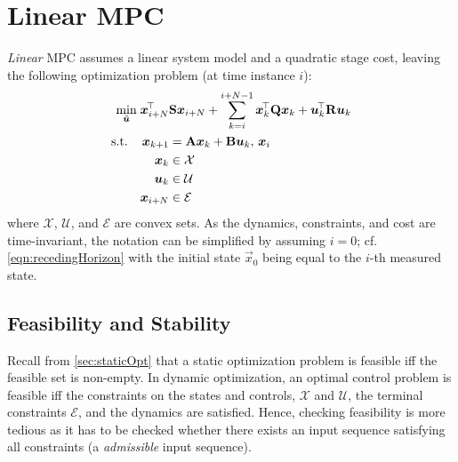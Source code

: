 	\section{Linear MPC}
		\emph{Linear} MPC assumes a linear system model and a quadratic stage cost, leaving the following optimization problem (at time instance \(i\)):
		\begin{equation}
			\begin{aligned}
				\min_{\tilde{\bm{u}}}\; & \bm{x}_{i + N}^{\!\top} \bm{\mathrm{S}} \bm{x}_{i + N} + \sum_{k = i}^{i + N - 1} \bm{x}_k^{\!\top} \bm{\mathrm{Q}} \bm{x}_k + \bm{u}_k^{\!\top} \bm{\mathrm{R}} \bm{u}_k \\
				\text{s.t.}\quad &
					\begin{aligned}[t]
						\bm{x}_{k + 1} &= \bm{\mathrm{A}} \bm{x}_k + \bm{\mathrm{B}} \bm{u}_k,\, \bm{x}_i \\
						\bm{x}_k &\in \mathcal{X} \\
						\bm{u}_k &\in \mathcal{U} \\
						\bm{x}_{i + N} &\in \mathcal{E}
					\end{aligned}
			\end{aligned}
			\label{eqn:linearRecedingHorizon}
		\end{equation}
		where \(\mathcal{X}\), \(\mathcal{U}\), and \(\mathcal{E}\) are convex sets. As the dynamics, constraints, and cost are time-invariant, the notation can be simplified by assuming \(i = 0\); cf. \eqref{eqn:recedingHorizon} with the initial state \(\vec{x}_0\) being equal to the \(i\)-th measured state.

		\subsection{Feasibility and Stability}
			Recall from \autoref{sec:staticOpt} that a static optimization problem is feasible iff the feasible set is non-empty. In dynamic optimization, an optimal control problem is feasible iff the constraints on the states and controls, \(\mathcal{X}\) and \(\mathcal{U}\), the terminal constraints \(\mathcal{E}\), and the dynamics are satisfied. Hence, checking feasibility is more tedious as it has to be checked whether there exists an input sequence satisfying all constraints (a \emph{admissible} input sequence).

